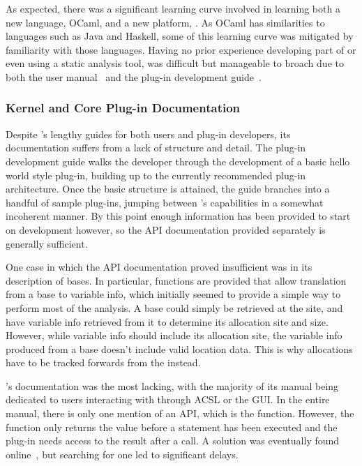 As expected, there was a significant learning curve involved in learning both a new language, OCaml, and a new platform, . As OCaml has similarities to languages such as Java and Haskell, some of this learning curve was mitigated by familiarity with those languages. Having no prior experience developing part of or even using a static analysis tool,  was difficult but manageable to broach due to both the user manual~\cite{framauser} and the plug-in development guide~\cite{framaplug}.

\subsubsection{Kernel and Core Plug-in Documentation}

Despite 's lengthy guides for both users and plug-in developers, its documentation suffers from a lack of structure and detail. The plug-in development guide walks the developer through the development of a basic hello world style plug-in, building up to the currently recommended plug-in architecture. Once the basic structure is attained, the guide branches into a handful of sample plug-ins, jumping between 's capabilities in a somewhat incoherent manner. By this point enough information has been provided to start on development however, so the API documentation provided separately is generally sufficient.

One case in which the API documentation proved insufficient was in its description of bases. In particular, functions are provided that allow translation from a base to variable info, which initially seemed to provide a simple way to perform most of the analysis. A base could simply be retrieved at the \free{} site, and have variable info retrieved from it to determine its allocation site and size. However, while variable info should include its allocation site, the variable info produced from a base doesn't include valid location data. This is why allocations have to be tracked forwards from the \malloc{} instead.

's documentation was the most lacking, with the majority of its manual being dedicated to users interacting with  through ACSL or the  GUI\@. In the entire manual, there is only one mention of an  API, which is the  function. However, the  function only returns the value before a statement has been executed and the  plug-in needs access to the result after a \malloc{} call. A solution was eventually found online~\cite{foldstate}, but searching for one led to significant delays.

